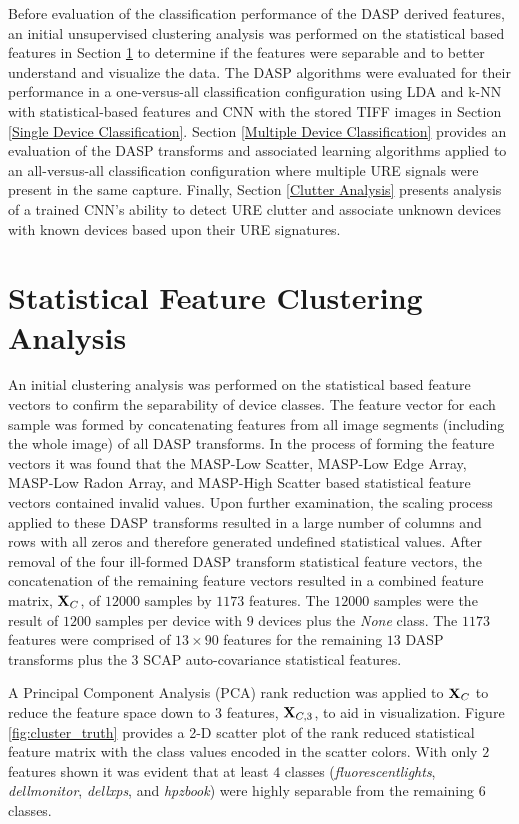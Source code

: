 Before evaluation of the classification performance of the DASP derived features, an initial unsupervised clustering analysis was performed on the statistical based features in Section \ref{Device Clustering Analysis} to determine if the features were separable and to better understand and visualize the data.  The DASP algorithms were evaluated for their performance in a one-versus-all classification configuration using LDA and k-NN with statistical-based features and CNN with the stored TIFF images in Section \ref{Single Device Classification}.  Section \ref{Multiple Device Classification} provides an evaluation of the DASP transforms and associated learning algorithms applied to an all-versus-all classification configuration where multiple URE signals were present in the same capture.  Finally, Section \ref{Clutter Analysis} presents analysis of a trained CNN's ability to detect URE clutter and associate unknown devices with known devices based upon their URE signatures. 

\section[Statistical Feature Clustering Analysis]{Statistical Feature Clustering Analysis}
\label{Device Clustering Analysis}

An initial clustering analysis was performed on the statistical based feature vectors to confirm the separability of device classes.  The feature vector for each sample was formed by concatenating features from all image segments (including the whole image) of all DASP transforms.  In the process of forming the feature vectors it was found that the MASP-Low Scatter, MASP-Low Edge Array, MASP-Low Radon Array, and MASP-High Scatter based statistical feature vectors contained invalid values.  Upon further examination, the scaling process applied to these DASP transforms resulted in a large number of columns and rows with all zeros and therefore generated undefined statistical values.  After removal of the four ill-formed DASP transform statistical feature vectors, the concatenation of the remaining feature vectors resulted in a combined feature matrix, $\textit{\bf{X}}_C$, of $12000$ samples by $1173$ features.  The $12000$ samples were the result of $1200$ samples per device with $9$ devices plus the \textit{None} class.  The $1173$ features were comprised of $13 \times 90$ features for the remaining $13$ DASP transforms plus the $3$ SCAP auto-covariance statistical features.

A Principal Component Analysis (PCA) rank reduction was applied to $\textit{\bf{X}}_C$ to reduce the feature space down to $3$ features, $\textit{\bf{X}}_{C,3}$, to aid in visualization.  Figure \ref{fig:cluster_truth} provides a 2-D scatter plot of the rank reduced statistical feature matrix with the class values encoded in the scatter colors.  With only $2$ features shown it was evident that at least $4$ classes (\textit{fluorescentlights}, \textit{dellmonitor}, \textit{dellxps}, and \textit{hpzbook}) were highly separable from the remaining $6$ classes.

